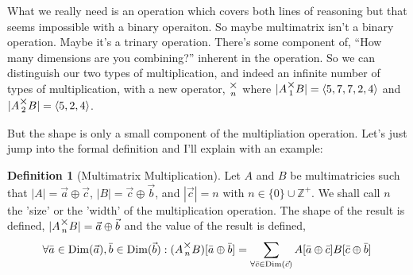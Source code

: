 \documentclass[12pt]{article}
\theoremstyle{definition}
\newtheorem{definition}{Definition}[section]
\theoremstyle{plain}
\theoremstyle{ppart}
\DeclareMathOperator{\Dim}{Dim}
\newcommand{\mmult}[1]{\text{\raisebox{1ex}{$\underset{#1}{\times}$}}}
\begin{document}
What we really need is an operation which covers both lines of reasoning but that
seems impossible with a binary operaiton. So maybe multimatrix isn't a binary operation.
Maybe it's a trinary operation. There's some component of, 
``How many dimensions are you combining?'' inherent
in the operation. So we can distinguish our two types of multiplication, and indeed
an infinite number of types of multiplication, with a new operator, $\mmult{n}$ where
$|A \mmult{1} B| = \left<5, 7, 7, 2, 4\right>$ and 
$|A \mmult{2} B| = \left<5, 2, 4\right>$.

But the shape is only a small component of the multipliation  operation. Let's
just jump into the formal definition and I'll explain with an example:

\begin{definition}[Multimatrix Multiplication]
\label{mm_mult}
Let $A$ and $B$ be multimatricies such that $|A| = \vec{a} \oplus \vec{c}$,
$|B| = \vec{c} \oplus \vec{b}$, and $|\vec{c}| = n$ with
$n \in \{0\} \cup \mathbb{Z}^{+}$. We shall call $n$ the 'size' or the 'width'
of the multiplication operation.
The shape of the result is defined, $|A \mmult{n} B| = \vec{a} \oplus \vec{b}$
and the value of the result is defined,
\[
\forall \bar{a} \in \Dim(\vec{a}), \bar{b} \in \Dim(\vec{b}):
(A \mmult{n}  B)[\bar{a} \oplus \bar{b}] =
\sum_{\forall \bar{c} \in \Dim(\vec{c})}
  A[\bar{a} \oplus \bar{c}] B[\bar{c} \oplus \bar{b}]
\]
\end{definition}
\end{document}
